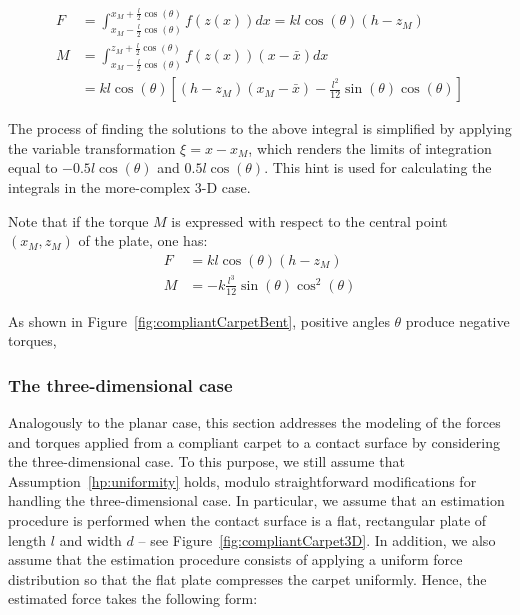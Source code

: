 \documentclass[12pt,a4paper,twoside]{article}
\begin{document}
\begin{subequations}
    \begin{alignat}{2}
        F &= \int_{x_M-\frac{l}{2}\cos(\theta)}^{x_M+\frac{l}{2}\cos(\theta)} f(z(x))dx=kl\cos(\theta)\left(h-z_M \right) \\\nonumber
        M &=\int_{x_M-\frac{l}{2}\cos(\theta)}^{z_M+\frac{l}{2}\cos(\theta)} f(z(x))(x{-}\bar{x}) dx \\ 
          &= kl\cos(\theta) \left[ (h-z_M)\left(x_M-\bar{x} \right) - 
          \frac{l^2}{12} \sin(\theta)\cos(\theta) \right] 
    \end{alignat}
\end{subequations}
%
\begin{figure}[t]
\end{figure}

The process of finding the solutions to the above integral is simplified by applying the variable transformation $\xi = x - x_M$, which renders the limits of integration equal to $-0.5l \cos(\theta)$ and $0.5l \cos(\theta)$. This hint is used for calculating the integrals in the more-complex 3-D case.

Note that if the torque $M$ is expressed with respect to the central point $(x_M,z_M)$ of the plate, one has:
\begin{subequations}
    \begin{alignat}{2}
        F &=kl\cos(\theta)\left(h-z_M \right) \\
        M &= -k
          \frac{l^3}{12} \sin(\theta)\cos^2(\theta) 
    \end{alignat}
\end{subequations}

As shown in Figure~\ref{fig:compliantCarpetBent},
positive angles $\theta$ produce negative torques, 

\subsubsection{The three-dimensional case}
Analogously to the planar case, this section addresses the modeling of the forces and torques applied from a compliant carpet to a contact surface by considering the three-dimensional case. To this purpose, we still assume that Assumption~\ref{hp:uniformity} holds, modulo straightforward modifications for handling the three-dimensional case. In particular, we assume that an estimation procedure is performed when the contact surface is a flat, rectangular plate of length $l$ and width $d$ -- see Figure~\ref{fig:compliantCarpet3D}. In addition, we also assume that the estimation procedure consists of applying  a uniform force distribution  so that  the flat plate compresses the carpet uniformly. Hence, the estimated force takes the following form:
\end{document}
